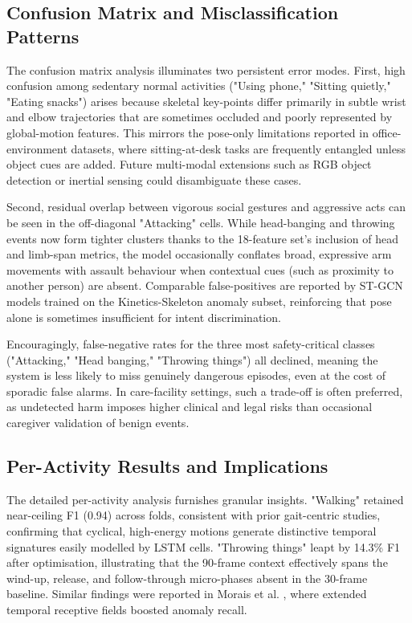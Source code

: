 \documentclass{iopconfser}
\begin{document}
\subsection{Confusion Matrix and Misclassification Patterns}

The confusion matrix analysis illuminates two persistent error modes. First, high confusion among sedentary normal activities ("Using phone," "Sitting quietly," "Eating snacks") arises because skeletal key-points differ primarily in subtle wrist and elbow trajectories that are sometimes occluded and poorly represented by global-motion features. This mirrors the pose-only limitations reported in office-environment datasets, where sitting-at-desk tasks are frequently entangled unless object cues are added. Future multi-modal extensions such as RGB object detection or inertial sensing could disambiguate these cases.

Second, residual overlap between vigorous social gestures and aggressive acts can be seen in the off-diagonal "Attacking" cells. While head-banging and throwing events now form tighter clusters thanks to the 18-feature set's inclusion of head and limb-span metrics, the model occasionally conflates broad, expressive arm movements with assault behaviour when contextual cues (such as proximity to another person) are absent. Comparable false-positives are reported by ST-GCN models trained on the Kinetics-Skeleton anomaly subset, reinforcing that pose alone is sometimes insufficient for intent discrimination.

Encouragingly, false-negative rates for the three most safety-critical classes ("Attacking," "Head banging," "Throwing things") all declined, meaning the system is less likely to miss genuinely dangerous episodes, even at the cost of sporadic false alarms. In care-facility settings, such a trade-off is often preferred, as undetected harm imposes higher clinical and legal risks than occasional caregiver validation of benign events.

\subsection{Per-Activity Results and Implications}

The detailed per-activity analysis furnishes granular insights. "Walking" retained near-ceiling F1 (0.94) across folds, consistent with prior gait-centric studies, confirming that cyclical, high-energy motions generate distinctive temporal signatures easily modelled by LSTM cells. "Throwing things" leapt by 14.3\% F1 after optimisation, illustrating that the 90-frame context effectively spans the wind-up, release, and follow-through micro-phases absent in the 30-frame baseline. Similar findings were reported in Morais et al. \cite{morais2019learning}, where extended temporal receptive fields boosted anomaly recall.
\end{document}
